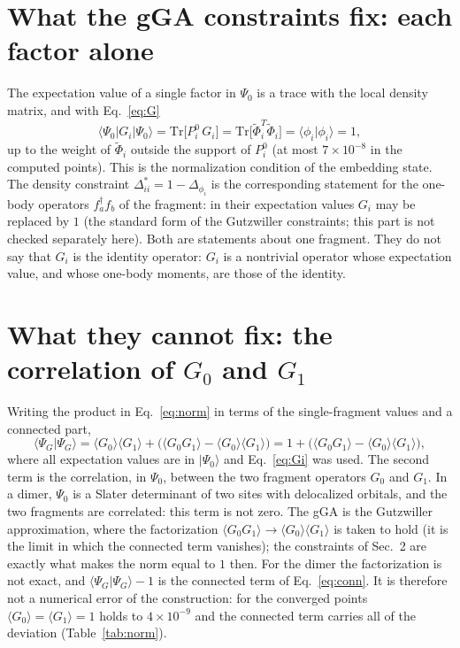 \documentclass[11pt]{article}
\begin{document}
\section{What the gGA constraints fix: each factor alone}
The expectation value of a single factor in $\Psi_0$ is a trace with the local density matrix, and with Eq.~\eqref{eq:G}
\begin{equation}
\langle\Psi_0|G_i|\Psi_0\rangle=\mathrm{Tr}\big[P^0_i\,G_i\big]=\mathrm{Tr}\big[\tilde\Phi_i^{T}\tilde\Phi_i\big]=\langle\phi_i|\phi_i\rangle=1 ,
\label{eq:Gi}
\end{equation}
up to the weight of $\tilde\Phi_i$ outside the support of $P^0_i$ (at most $7\times10^{-8}$ in the computed points). This is the normalization condition of the embedding state. The density constraint $\Delta^*_{ii}=1-\Delta_{\phi_i}$ is the corresponding statement for the one-body operators $f^\dagger_af_b$ of the fragment: in their expectation values $G_i$ may be replaced by $1$ (the standard form of the Gutzwiller constraints; this part is not checked separately here). Both are statements about one fragment. They do not say that $G_i$ is the identity operator: $G_i$ is a nontrivial operator whose expectation value, and whose one-body moments, are those of the identity.

\section{What they cannot fix: the correlation of $G_0$ and $G_1$}
Writing the product in Eq.~\eqref{eq:norm} in terms of the single-fragment values and a connected part,
\begin{equation}
\langle\Psi_G|\Psi_G\rangle=\langle G_0\rangle\langle G_1\rangle+\Big(\langle G_0G_1\rangle-\langle G_0\rangle\langle G_1\rangle\Big)=1+\Big(\langle G_0G_1\rangle-\langle G_0\rangle\langle G_1\rangle\Big),
\label{eq:conn}
\end{equation}
where all expectation values are in $|\Psi_0\rangle$ and Eq.~\eqref{eq:Gi} was used. The second term is the correlation, in $\Psi_0$, between the two fragment operators $G_0$ and $G_1$. In a dimer, $\Psi_0$ is a Slater determinant of two sites with delocalized orbitals, and the two fragments are correlated: this term is not zero. The gGA is the Gutzwiller approximation, where the factorization $\langle G_0G_1\rangle\to\langle G_0\rangle\langle G_1\rangle$ is taken to hold (it is the limit in which the connected term vanishes); the constraints of Sec.~2 are exactly what makes the norm equal to $1$ then. For the dimer the factorization is not exact, and $\langle\Psi_G|\Psi_G\rangle-1$ is the connected term of Eq.~\eqref{eq:conn}. It is therefore not a numerical error of the construction: for the converged points $\langle G_0\rangle=\langle G_1\rangle=1$ holds to $4\times10^{-9}$ and the connected term carries all of the deviation (Table~\ref{tab:norm}).
\end{document}
